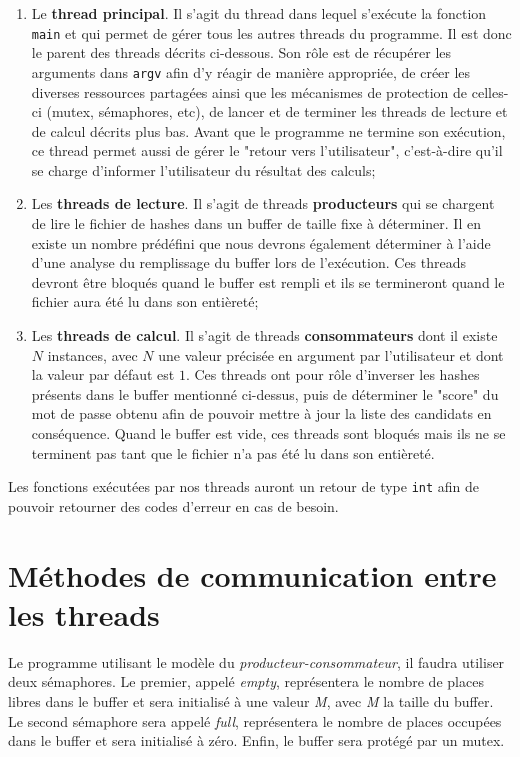 \documentclass{article}
\begin{document}
	\begin{enumerate}
		\item
		Le \textbf{thread principal}.
		Il s'agit du thread dans lequel s'exécute la fonction \lstinline{main} et qui permet de gérer tous les autres threads du programme.
		Il est donc le parent des threads décrits ci-dessous.
		Son rôle est de récupérer les arguments dans \lstinline{argv} afin d'y réagir de manière appropriée, de créer les diverses ressources partagées ainsi que les mécanismes de protection de celles-ci (mutex, sémaphores, etc), de lancer et de terminer les threads de lecture et de calcul décrits plus bas.
		Avant que le programme ne termine son exécution, ce thread permet aussi de gérer le "retour vers l'utilisateur", c'est-à-dire qu'il se charge d'informer l'utilisateur du résultat des calculs;
		
		\item
		Les \textbf{threads de lecture}.
		Il s'agit de threads \textbf{producteurs} qui se chargent de lire le fichier de hashes dans un buffer de taille fixe à déterminer.
		Il en existe un nombre prédéfini que nous devrons également déterminer à l'aide d'une analyse du remplissage du buffer lors de l'exécution.
		Ces threads devront être bloqués quand le buffer est rempli et ils se termineront quand le fichier aura été lu dans son entièreté;
		
		\item
		Les \textbf{threads de calcul}.
		Il s'agit de threads \textbf{consommateurs} dont il existe $N$ instances, avec $N$ une valeur précisée en argument par l'utilisateur et dont la valeur par défaut est $1$.
		Ces threads ont pour rôle d'inverser les hashes présents dans le buffer mentionné ci-dessus, puis de déterminer le "score" du mot de passe obtenu afin de pouvoir mettre à jour la liste des candidats en conséquence.
		Quand le buffer est vide, ces threads sont bloqués mais ils ne se terminent pas tant que le fichier n'a pas été lu dans son entièreté.
	\end{enumerate}
	
	\noindent
	Les fonctions exécutées par nos threads auront un retour de type \lstinline{int} afin de pouvoir retourner des codes d'erreur en cas de besoin.

\section{Méthodes de communication entre les threads}
\noindent
	Le programme utilisant le modèle du \textit{producteur-consommateur}, il faudra utiliser deux sémaphores. Le premier, appelé \textit{empty}, représentera le nombre de places libres dans le buffer et sera initialisé à une valeur \textit{M}, avec \textit{M} la taille du buffer. Le second sémaphore sera appelé \textit{full}, représentera le nombre de places occupées dans le buffer et sera initialisé à zéro.
	Enfin, le buffer sera protégé par un mutex.
\end{document}

